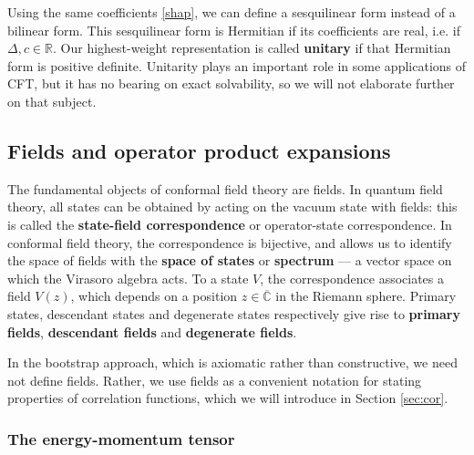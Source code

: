 \documentclass[12pt, a4paper]{article}
\newcommand{\myindex}[1]{\textbf{\boldmath #1}}
\theoremstyle{break}
\begin{document}
Using the same coefficients \eqref{shap}, we can define a sesquilinear form instead of a bilinear form. This sesquilinear form is Hermitian if its coefficients are real, i.e. if $\Delta,c\in\mathbb{R}$. Our highest-weight representation is called \myindex{unitary} if that Hermitian form is positive definite. Unitarity plays an important role in some applications of CFT, but it has no bearing on exact solvability, so we will not elaborate further on that subject. 


\subsection{Fields and operator product expansions}\label{sec:fope}

The fundamental objects of conformal field theory are fields. In quantum field theory, all states can be obtained by acting on the vacuum state with fields: this is called the \myindex{state-field correspondence} or operator-state correspondence. In conformal field theory, the correspondence is bijective, and allows us to identify the space of fields with the \myindex{space of states}  or \myindex{spectrum}  --- a vector space on which the Virasoro algebra acts. To a state $V$, the correspondence associates a field $V(z)$, which depends on a position $z\in\overline{\mathbb{C}}$ in the Riemann sphere. Primary states, descendant states and degenerate states respectively give rise to \myindex{primary fields}, \myindex{descendant fields} and \myindex{degenerate fields}.

In the bootstrap approach, which is axiomatic rather than constructive, we need not define fields. Rather, we use fields as a convenient notation for stating properties of correlation functions, which we will introduce in Section \ref{sec:cor}. 

\subsubsection{The energy-momentum tensor}
\end{document}
